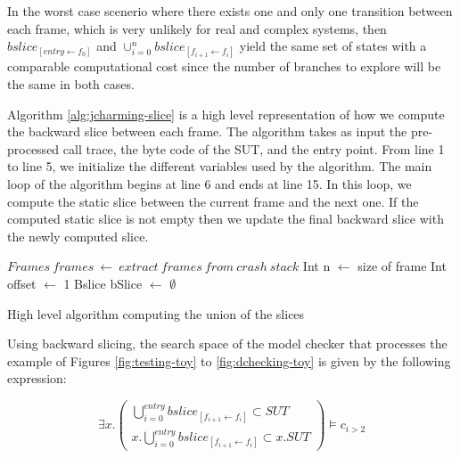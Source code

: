 \documentclass[times]{smrauth}
\begin{document}
In the worst case scenerio where there exists one and only one
transition between each frame, which is very unlikely for real
and complex systems, then $bslice_{[entry \leftarrow f_0]}$ and
 $\cup_{i=0}^n bslice_{[f_{i+1} \leftarrow f_i]}$ yield the same set of states with a
comparable computational cost since the number of branches
to explore will be the same in both cases.

Algorithm \ref{alg:jcharming-slice} is a high level
representation of how we compute the backward slice between
each frame. The algorithm takes as input the pre-processed
call trace, the byte code of the SUT, and the entry point. From
line 1 to line 5, we initialize the different variables used by the
algorithm. The main loop of the algorithm begins at line 6 and
ends at line 15. In this loop, we compute the static slice
between the current frame and the next one. If the computed
static slice is not empty then we update the final backward
slice with the newly computed slice. \\


\begin{algorithm}[H]
 $Frames~frames~\leftarrow~extract~frames~from~crash~stack$\;
 Int n $\leftarrow$ size of frame\;
 Int offset $\leftarrow$ 1\;
 Bslice bSlice $\leftarrow$ $\emptyset$\;
\caption{High level algorithm computing the union of the slices\label{alg:jcharming-slice}}
\end{algorithm}

\vspace*{0.3cm}

Using backward slicing, the search space of the model checker
that processes the example of Figures \ref{fig:testing-toy} to \ref{fig:dchecking-toy} is given by the
following expression:

\begin{equation}
  \exists x.
  \begin{pmatrix}
    \bigcup_{i=0}^{entry} bslice_{[f_{i+1} \leftarrow f_i]}  \subset SUT \\
    x.\bigcup_{i=0}^{entry} bslice_{[f_{i+1} \leftarrow f_i]}  \subset x.SUT
  \end{pmatrix}
  \models c_{i>2}
\end{equation}
\end{document}
